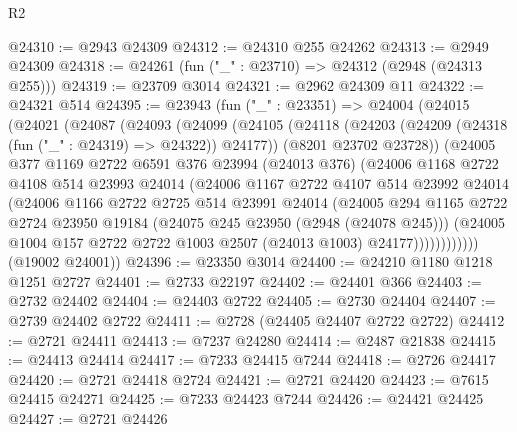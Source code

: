 \begin{lexlean}{R2}
\begin{coremodule}
@24310 := @2943 @24309
@24312 := @24310 @255 @24262
@24313 := @2949 @24309
@24318 := @24261 (fun ("_" : @23710) => @24312 (@2948 (@24313 @255)))
@24319 := @23709 @3014
@24321 := @2962 @24309 @11
@24322 := @24321 @514
@24395 := @23943
    (fun ("_" : @23351) =>
    @24004
      (@24015
        (@24021
          (@24087
            (@24093
              (@24099
                (@24105
                  (@24118
                    (@24203 (@24209 (@24318 (fun ("_" : @24319) => @24322)) @24177))
                    (@8201 @23702 @23728))
                  (@24005
                    @377
                    @1169
                    @2722
                    @6591
                    @376
                    @23994
                    (@24013 @376)
                    (@24006
                      @1168
                      @2722
                      @4108
                      @514
                      @23993
                      @24014
                      (@24006
                        @1167
                        @2722
                        @4107
                        @514
                        @23992
                        @24014
                        (@24006
                          @1166
                          @2722
                          @2725
                          @514
                          @23991
                          @24014
                          (@24005
                            @294
                            @1165
                            @2722
                            @2724
                            @23950
                            @19184
                            (@24075 @245 @23950 (@2948 (@24078 @245)))
                            (@24005
                              @1004
                              @157
                              @2722
                              @2722
                              @1003
                              @2507
                              (@24013 @1003)
                              @24177))))))))))))
      (@19002 @24001))
@24396 := @23350 @3014
@24400 := @24210 @1180 @1218 @1251 @2727
@24401 := @2733 @22197
@24402 := @24401 @366
@24403 := @2732 @24402
@24404 := @24403 @2722
@24405 := @2730 @24404
@24407 := @2739 @24402 @2722
@24411 := @2728 (@24405 @24407 @2722 @2722)
@24412 := @2721 @24411
@24413 := @7237 @24280
@24414 := @2487 @21838
@24415 := @24413 @24414
@24417 := @7233 @24415 @7244
@24418 := @2726 @24417
@24420 := @2721 @24418 @2724
@24421 := @2721 @24420
@24423 := @7615 @24415 @24271
@24425 := @7233 @24423 @7244
@24426 := @24421 @24425
@24427 := @2721 @24426

\end{coremodule}
\end{lexlean}
